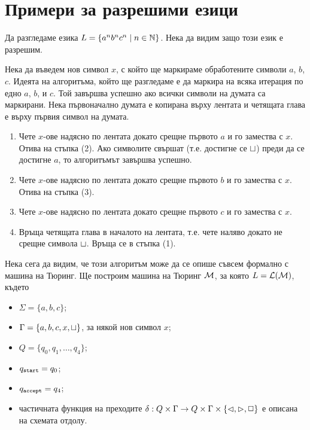 \section{Примери за разрешими езици}

\begin{example}
  Да разгледаме езика $L = \{a^nb^nc^n \mid n\in\mathbb{N}\}$.
  Нека да видим защо този език е разрешим.
 
  Нека да въведем нов символ $x$, с който ще маркираме обработените символи $a$, $b$, $c$.
  Идеята на алгоритъма, който ще разгледаме е да маркира на всяка итерация по едно $a$, $b$, и $c$.
  Той завършва успешно ако всички символи на думата са маркирани.
  Нека първоначално думата е копирана върху лентата и четящата глава е върху първия символ на думата.
  \begin{enumerate}[(1)]
  \item 
    Чете $x$-ове надясно по лентата докато срещне първото $a$ и го замества с $x$. Отива на стъпка (2).
    Ако символите свършат (т.е. достигне се $\sqcup$) преди да се достигне $a$,
    то алгоритъмът завършва успешно.
  \item
    Чете $x$-ове надясно по лентата докато срещне първото $b$ и го замества с $x$.
    Отива на стъпка (3).
  \item
    Чете $x$-ове надясно по лентата докато срещне първото $c$ и го замества с $x$.
  \item
    Връща четящата глава в началото на лентата, т.е. чете наляво докато не срещне символа $\sqcup$.
    Връща се в стъпка (1). 
  \end{enumerate}

  Нека сега да видим, че този алгоритъм може да се опише съвсем формално с машина на Тюринг.
  Ще построим машина на Тюринг $\mathcal{M}$, за която $L = \mathcal{L}(\mathcal{M})$, където
  \begin{itemize}
  \item 
    $\Sigma = \{a,b,c\}$;
  \item
    $\Gamma = \{a,b,c,x,\sqcup\}$, за някой нов символ $x$;
  \item
    $Q = \{q_0,q_1,\dots,q_4\}$;
  \item
    $q_{\texttt{start}} = q_0$;
  \item
    $q_{\texttt{accept}} = q_4$;
  \item
    частичната функция на преходите $\delta:Q\times\Gamma \to Q\times\Gamma\times\{\lhd,\rhd,\Box\}$
    е описана на схемата отдолу.
  \end{itemize}


\end{example}
